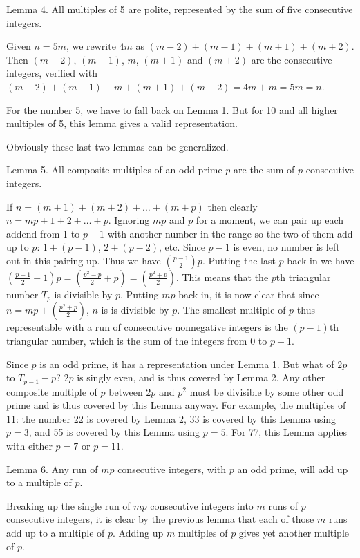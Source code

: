 \documentclass[12pt]{article}
\begin{document}
Lemma 4. All multiples of 5 are polite, represented by the sum of five consecutive integers.

Given $n = 5m$, we rewrite $4m$ as $(m - 2) + (m - 1) + (m + 1) + (m + 2)$. Then $(m - 2)$, $(m - 1)$, $m$, $(m + 1)$ and $(m + 2)$ are the consecutive integers, verified with $(m - 2) + (m - 1) + m + (m + 1) + (m + 2) = 4m + m = 5m = n$.

For the number 5, we have to fall back on Lemma 1. But for 10 and all higher multiples of 5, this lemma gives a valid representation.

Obviously these last two lemmas can be generalized.

Lemma 5. All composite multiples of an odd prime $p$ are the sum of $p$ consecutive integers.

If $n = (m + 1) + (m + 2) + \ldots + (m + p)$ then clearly $n = mp + 1 + 2 + \ldots + p$. Ignoring $mp$ and $p$ for a moment, we can pair up each addend from 1 to $p - 1$ with another number in the range so the two of them add up to $p$: $1 + (p - 1)$, $2 + (p - 2)$, etc. Since $p - 1$ is even, no number is left out in this pairing up. Thus we have $\displaystyle \left( \frac{p - 1}{2} \right)p$. Putting the last $p$ back in we have $\displaystyle \left( \frac{p - 1}{2} + 1 \right)p = \left( \frac{p^2 - p}{2} + p \right) = \left( \frac{p^2 + p}{2} \right).$ This means that the $p$th triangular number $T_p$ is divisible by $p$. Putting $mp$ back in, it is now clear that since $\displaystyle n = mp + \left( \frac{p^2 + p}{2} \right)$, $n$ is is divisible by $p$. The smallest multiple of $p$ thus representable with a run of consecutive nonnegative integers is the $(p - 1)$th triangular number, which is the sum of the integers from 0 to $p - 1$.

Since $p$ is an odd prime, it has a representation under Lemma 1. But what of $2p$ to $T_{p - 1} - p$? $2p$ is singly even, and is thus covered by Lemma 2. Any other composite multiple of $p$ between $2p$ and $p^2$ must be divisible by some other odd prime and is thus covered by this Lemma anyway. For example, the multiples of 11: the number 22 is covered by Lemma 2, 33 is covered by this Lemma using $p = 3$, and 55 is covered by this Lemma using $p = 5$. For 77, this Lemma applies with either $p = 7$ or $p = 11$.

Lemma 6. Any run of $mp$ consecutive integers, with $p$ an odd prime, will add up to a multiple of $p$.

Breaking up the single run of $mp$ consecutive integers into $m$ runs of $p$ consecutive integers, it is clear by the previous lemma that each of those $m$ runs add up to a multiple of $p$. Adding up $m$ multiples of $p$ gives yet another multiple of $p$.
\end{document}
